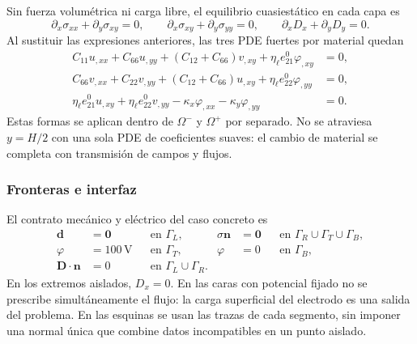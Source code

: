 Sin fuerza volumétrica ni carga libre, el equilibrio cuasiestático en cada
capa es
\begin{equation}
  \partial_x\sigma_{xx}+\partial_y\sigma_{xy}=0,\qquad
  \partial_x\sigma_{xy}+\partial_y\sigma_{yy}=0,\qquad
  \partial_xD_x+\partial_yD_y=0.
  \label{eq:p5-expansion-balances}
\end{equation}
Al sustituir las expresiones anteriores, las tres PDE fuertes por material
quedan
\begin{align}
  C_{11}u_{,xx}+C_{66}u_{,yy}+(C_{12}+C_{66})v_{,xy}
      +\eta_\ell e_{21}^{0}\varphi_{,xy}&=0,\\
  C_{66}v_{,xx}+C_{22}v_{,yy}+(C_{12}+C_{66})u_{,xy}
      +\eta_\ell e_{22}^{0}\varphi_{,yy}&=0,\\
  \eta_\ell e_{21}^{0}u_{,xy}+\eta_\ell e_{22}^{0}v_{,yy}
      -\kappa_x\varphi_{,xx}-\kappa_y\varphi_{,yy}&=0.
  \label{eq:p5-expansion-pdes}
\end{align}
Estas formas se aplican dentro de $\Omega^-$ y $\Omega^+$ por separado. No
se atraviesa $y=H/2$ con una sola PDE de coeficientes suaves: el cambio de
material se completa con transmisión de campos y flujos.

\subsubsection{Fronteras e interfaz}

El contrato mecánico y eléctrico del caso concreto es
\begin{align}
  \mathbf d&=\mathbf 0 &&\text{en }\Gamma_L, &
  \sigma\boldsymbol n&=\mathbf 0
       &&\text{en }\Gamma_R\cup\Gamma_T\cup\Gamma_B,\\
  \varphi&=100\,\mathrm{V} &&\text{en }\Gamma_T, &
  \varphi&=0 &&\text{en }\Gamma_B,\\
  \mathbf D\cdot\boldsymbol n&=0
       &&\text{en }\Gamma_L\cup\Gamma_R.
  \label{eq:p5-expansion-bc}
\end{align}
En los extremos aislados, $D_x=0$. En las caras con potencial fijado no se
prescribe simultáneamente el flujo: la carga superficial del electrodo es una
salida del problema. En las esquinas se usan las trazas de cada segmento, sin
imponer una normal única que combine datos incompatibles en un punto aislado.

